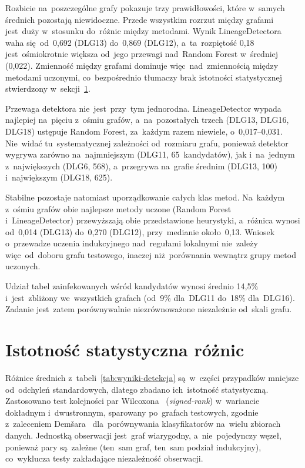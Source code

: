 \documentclass[polish,master,a4paper,oneside]{ppfcmthesis}
\renewcommand{\_}{\origtextunderscore\ifmmode\else\allowbreak\fi}
\begin{document}
Rozbicie na~poszczególne grafy pokazuje trzy prawidłowości, które w~samych
średnich pozostają niewidoczne. Przede wszystkim rozrzut między grafami jest~duży w~stosunku do~różnic między
metodami. Wynik LineageDetectora waha się~od~0{,}692 (DLG13) do~0{,}869
(DLG12), a~ta~rozpiętość 0{,}18 jest~ośmiokrotnie większa od~jego przewagi
nad~Random Forest w~średniej (0{,}022). Zmienność między grafami dominuje
więc~nad~zmiennością między metodami uczonymi, co~bezpośrednio tłumaczy brak
istotności statystycznej stwierdzony w~sekcji~\ref{sec:istotnosc}.

Przewaga detektora nie~jest~przy~tym jednorodna. LineageDetector
wypada najlepiej na~pięciu z~ośmiu grafów, a~na~pozostałych trzech (DLG13,
DLG16, DLG18) ustępuje Random Forest, za~każdym razem niewiele,
o~0{,}017--0{,}031. Nie~widać tu~systematycznej zależności od~rozmiaru grafu,
ponieważ detektor wygrywa zarówno na~najmniejszym (DLG11, 65~kandydatów), jak
i~na~jednym z~największych (DLG6, 568), a~przegrywa na~grafie średnim
(DLG13, 100) i~największym (DLG18, 625).

Stabilne pozostaje natomiast uporządkowanie całych klas metod.
Na~każdym z~ośmiu grafów obie najlepsze metody uczone (Random Forest
i~LineageDetector) przewyższają obie przedstawione heurystyki, a~różnica
wynosi od~0{,}014 (DLG13) do~0{,}270 (DLG12), przy~medianie około~0{,}13.
Wniosek o~przewadze uczenia indukcyjnego nad~regułami lokalnymi nie~zależy
więc~od~doboru grafu testowego, inaczej niż~porównania wewnątrz grupy metod
uczonych.

Udział tabel zainfekowanych wśród kandydatów wynosi średnio 14{,}5\%
i~jest~zbliżony we~wszystkich grafach (od~9\% dla~DLG11 do~18\% dla~DLG16).
Zadanie jest~zatem porównywalnie niezrównoważone niezależnie od~skali grafu.

\section{Istotność statystyczna różnic}
\label{sec:istotnosc}

Różnice średnich z~tabeli~\ref{tab:wyniki-detekcja} są~w~części przypadków
mniejsze od~odchyleń standardowych, dlatego zbadano ich~istotność statystyczną.
Zastosowano test kolejności par Wilcoxona~\cite{Wilcoxon1945}
(\emph{signed-rank}) w~wariancie dokładnym i~dwustronnym, sparowany
po~grafach testowych, zgodnie z~zaleceniem Demšara~\cite{Demsar2006}
dla~porównywania klasyfikatorów na~wielu zbiorach danych. Jednostką
obserwacji jest~graf wiarygodny, a~nie~pojedynczy węzeł, ponieważ pary są~zależne
(ten~sam graf, ten~sam podział indukcyjny), co~wyklucza testy zakładające
niezależność obserwacji.
\end{document}
